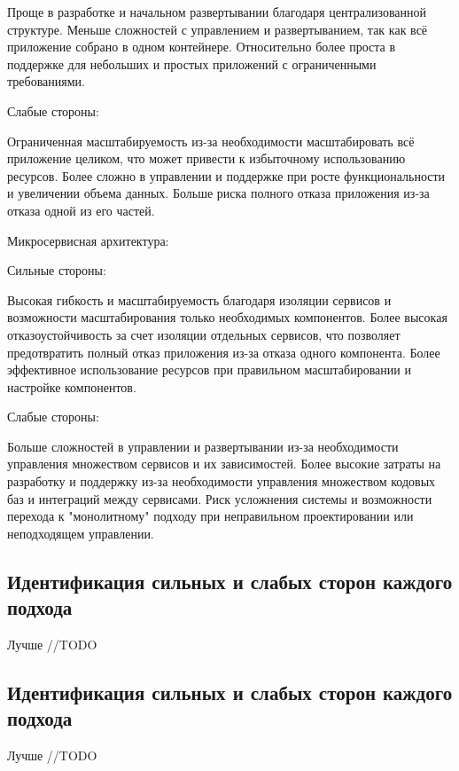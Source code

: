         Проще в разработке и начальном развертывании благодаря централизованной структуре.
        Меньше сложностей с управлением и развертыванием, так как всё приложение собрано в одном контейнере.
        Относительно более проста в поддержке для небольших и простых приложений с ограниченными требованиями.
    
    Слабые стороны:
    
        Ограниченная масштабируемость из-за необходимости масштабировать всё приложение целиком, что может привести к избыточному использованию ресурсов.
        Более сложно в управлении и поддержке при росте функциональности и увеличении объема данных.
        Больше риска полного отказа приложения из-за отказа одной из его частей.
    
    Микросервисная архитектура:
    
    Сильные стороны:
    
        Высокая гибкость и масштабируемость благодаря изоляции сервисов и возможности масштабирования только необходимых компонентов.
        Более высокая отказоустойчивость за счет изоляции отдельных сервисов, что позволяет предотвратить полный отказ приложения из-за отказа одного компонента.
        Более эффективное использование ресурсов при правильном масштабировании и настройке компонентов.
    
    Слабые стороны:
    
        Больше сложностей в управлении и развертывании из-за необходимости управления множеством сервисов и их зависимостей.
        Более высокие затраты на разработку и поддержку из-за необходимости управления множеством кодовых баз и интеграций между сервисами.
        Риск усложнения системы и возможности перехода к "монолитному" подходу при неправильном проектировании или неподходящем управлении.

\subsection{Идентификация сильных и слабых сторон каждого подхода}
    Лучше
    //TODO

\subsection{Идентификация сильных и слабых сторон каждого подхода}
    Лучше
    //TODO
    
        
\clearpage